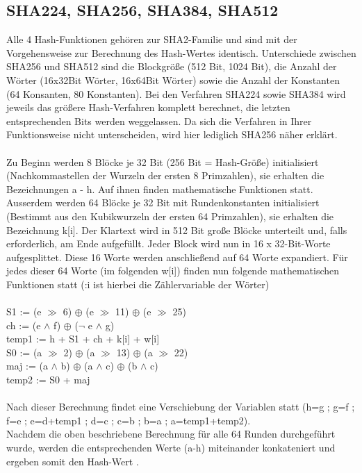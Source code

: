 \documentclass[10pt, a4paper,headsepline,pointednumbers]{scrreprt}
\begin{document}
\subsection{SHA224, SHA256, SHA384, SHA512}
Alle 4 Hash-Funktionen gehören zur SHA2-Familie und sind mit der Vorgehensweise zur Berechnung des Hash-Wertes identisch. Unterschiede zwischen SHA256 und SHA512 sind die Blockgröße (512 Bit, 1024 Bit), die Anzahl der Wörter (16x32Bit Wörter, 16x64Bit Wörter) sowie die Anzahl der Konstanten (64 Konsanten, 80 Konstanten). Bei den Verfahren SHA224 sowie SHA384 wird jeweils das größere Hash-Verfahren komplett berechnet, die letzten entsprechenden Bits werden weggelassen. Da sich die Verfahren in Ihrer Funktionsweise nicht unterscheiden, wird hier lediglich SHA256 näher erklärt.  \\ \\
Zu Beginn werden 8 Blöcke je 32 Bit (256 Bit = Hash-Größe) initialisiert (Nachkommastellen der Wurzeln der ersten 8 Primzahlen), sie erhalten die Bezeichnungen a - h. Auf ihnen finden mathematische Funktionen statt. Ausserdem werden 64 Blöcke je 32 Bit mit Rundenkonstanten initialisiert (Bestimmt aus den Kubikwurzeln der ersten 64 Primzahlen), sie erhalten die Bezeichnung k[i].
Der Klartext wird in 512 Bit große Blöcke unterteilt und, falls erforderlich, am Ende aufgefüllt. Jeder Block wird nun in 16 x 32-Bit-Worte aufgesplittet. Diese 16 Worte werden anschließend auf 64 Worte expandiert. Für jedes dieser 64 Worte (im folgenden w[i]) finden nun folgende mathematischen Funktionen statt (:i ist hierbei die Zählervariable der Wörter) \\ \\
S1 := (e $\gg$ 6) $\oplus$ (e $\gg$ 11) $\oplus$ (e $\gg$ 25) \\
ch := (e $\land$ f) $\oplus$ ($\lnot$ e $\land$ g) \\
temp1 := h + S1 + ch + k[i] + w[i]\\
S0 := (a $\gg$ 2) $\oplus$ (a $\gg$ 13) $\oplus$ (a $\gg$ 22) \\
maj := (a $\land$ b) $\oplus$ (a $\land$ c) $\oplus$ (b $\land$ c) \\
temp2 := S0 + maj \\ \\
Nach dieser Berechnung findet eine Verschiebung der Variablen statt (h=g ; g=f ; f=e ; e=d+temp1 ; d=c ; c=b ; b=a ; a=temp1+temp2). \\
Nachdem die oben beschriebene Berechnung für alle 64 Runden durchgeführt wurde, werden die entsprechenden Werte (a-h) miteinander konkateniert und ergeben somit den Hash-Wert \cite{website:nist-sha} \citep[S. 89f]{book:practical-crypto}.
\end{document}
